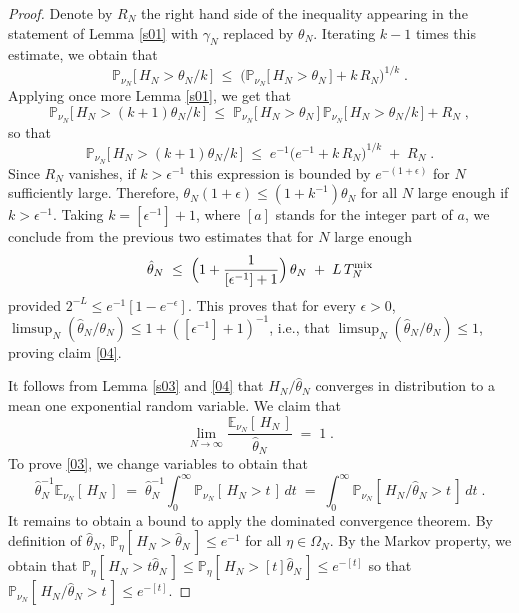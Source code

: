 \documentclass[reqno]{amsart}
\begin{document}
\begin{proof}
Denote by $R_N$ the right hand side of the inequality appearing in the
statement of Lemma \ref{s01} with $\gamma_N$ replaced by
$\theta_N$. Iterating $k-1$ times this estimate, we obtain that
\begin{equation*}
{{\mathbb P}}_{\nu_N} \big[\, H_N > \theta_N/k \,\big] \;\le\;
\Big({{\mathbb P}}_{\nu_N} \big[\, H_N > \theta_N \,\big] +
k \, R_N\Big)^{1/k}\;.
\end{equation*}
Applying once more Lemma \ref{s01}, we get that
\begin{equation*}
{{\mathbb P}}_{\nu_N} \big[\, H_N > (k+1)\theta_N/k \,\big] \;\le\;
{{\mathbb P}}_{\nu_N} \big[\, H_N > \theta_N \,\big] \,
{{\mathbb P}}_{\nu_N} \big[\, H_N > \theta_N/k \,\big] +
R_N\;,
\end{equation*}
so that
\begin{equation*}
{{\mathbb P}}_{\nu_N} \big[\, H_N > (k+1)\theta_N/k \,\big]
\;\le\; e^{-1} \big( e^{-1} + k \, R_N\big)^{1/k} \;+\; R_N\;.
\end{equation*}
Since $R_N$ vanishes, if $k> \epsilon^{-1}$ this expression is bounded
by $e^{-(1+\epsilon)}$ for $N$ sufficiently large. Therefore,
$\theta_N(1+\epsilon) \le (1+ k^{-1}) \theta_N$ for all $N$ large
enough if $k> \epsilon^{-1}$. Taking $k= [\epsilon^{-1}] +1$, where
$[a]$ stands for the integer part of $a$, we conclude from the
previous two estimates that for $N$ large enough
\begin{equation*}
\hat \theta_N \;\le\; \Big(1+ \frac 1{[\epsilon^{-1}] +1} \Big) 
\, \theta_N  \;+\; L \, T^{\rm mix}_N
\end{equation*}
provided $2^{-L} \le e^{-1} [ 1 - e^{-\epsilon}]$. This proves that
for every $\epsilon >0$, $\limsup_N (\hat \theta_N/\theta_N)\le 1+
([\epsilon^{-1}] +1)^{-1}$, i.e., that $\limsup_N (\hat
\theta_N/\theta_N)\le 1$, proving claim \eqref{04}.

It follows from Lemma \ref{s03} and \eqref{04} that $H_N/\hat
\theta_N$ converges in distribution to a mean one exponential random
variable.  We claim that
\begin{equation}
\label{03}
\lim_{N\to\infty} \frac{{{\mathbb E}}_{\nu_N} [\,
  H_N\,]}{\hat\theta_N} \;=\; 1\;.
\end{equation}
To prove \eqref{03}, we change variables to obtain that
\begin{equation*}
\hat\theta_N^{-1} {{\mathbb E}}_{\nu_N} [\,H_N\,] \;=\;
\hat\theta_N^{-1} \int_0^\infty  {{\mathbb P}}_{\nu_N} 
[\,H_N > t \,]\, dt \;=\;
\int_0^\infty  {{\mathbb P}}_{\nu_N} 
[\,H_N / \hat\theta_N  > t \,]\, dt \;.
\end{equation*}
It remains to obtain a bound to apply the dominated convergence
theorem. By definition of $\hat\theta_N$, ${{\mathbb P}}_{\eta} [\,H_N >
\hat\theta_N\,] \le e^{-1}$ for all $\eta\in \Omega_N$. By the Markov
property, we obtain that ${{\mathbb P}}_{\eta} [\,H_N > t \hat\theta_N\,] \le
{{\mathbb P}}_{\eta} [\,H_N > [t] \hat\theta_N\,] \le e^{-[t]}$ so that ${{\mathbb P}}_{\nu_N} [\,H_N / \hat\theta_N > t \,]\le e^{-[t]}$.
\end{proof}
\end{document}
